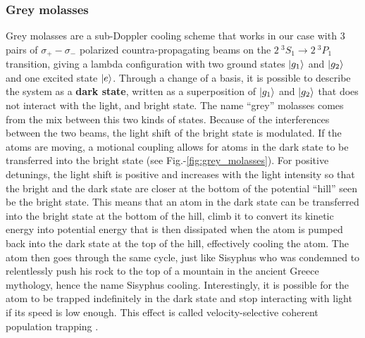 \subsubsection{Grey molasses}


Grey molasses are a sub-Doppler cooling scheme \cite{cohen1990atomic} that works in our case with 3 pairs of $\sigma_{+} - \sigma_{-}$ polarized countra-propagating beams on the $2 \ ^3 S_1 \rightarrow 2 \ ^3 P_1$ transition, giving a lambda configuration with two ground states $\ket{g_1}$ and $\ket{g_2}$ and one excited state $\ket{e}$. Through a change of a basis, it is possible to describe the system as a \textbf{dark state}, written as a superposition of $\ket{g_1}$ and $\ket{g_2}$ that does not interact with the light, and bright state. The name ``grey'' molasses comes from the mix between this two kinds of states. Because of the interferences between the two beams, the light shift of the bright state is modulated. If the atoms are moving, a motional coupling allows for atoms in the dark state to be transferred into the bright state (see Fig.-\ref{fig:grey_molasses}). For positive detunings, the light shift is positive and increases with the light intensity so that the bright and the dark state are closer at the bottom of the potential ``hill'' seen be the bright state. This means that an atom in the dark state can be transferred into the bright state at the bottom of the hill, climb it to convert its kinetic energy into potential energy that is then dissipated when the atom is pumped back into the dark state at the top of the hill, effectively cooling the atom. The atom then goes through the same cycle, just like Sisyphus who was condemned to relentlessly push his rock to the top of a mountain in the ancient Greece mythology, hence the name Sisyphus cooling. Interestingly, it is possible for the atom to be trapped indefinitely in the dark state and stop interacting with light if its speed is low enough. This effect is called velocity-selective coherent population trapping \cite{aspect1988laser}.


